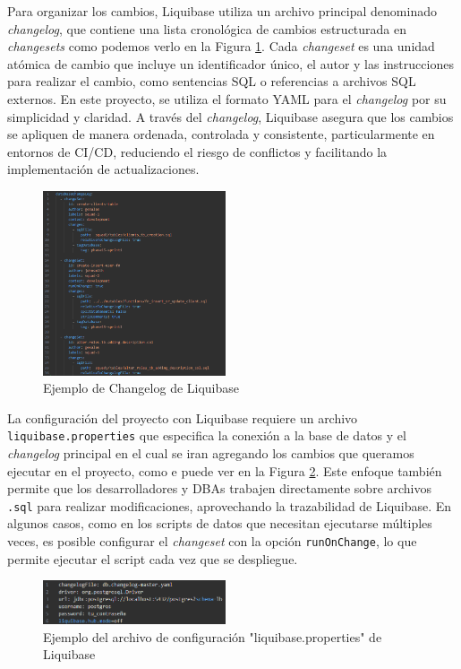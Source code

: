 \documentclass{IEEEtran}
\begin{document}
Para organizar los cambios, Liquibase utiliza un archivo principal denominado \textit{changelog}, que contiene una lista cronológica de cambios estructurada en \textit{changesets} como podemos verlo en la Figura \ref{fig:changelogFig}. Cada \textit{changeset} es una unidad atómica de cambio que incluye un identificador único, el autor y las instrucciones para realizar el cambio, como sentencias SQL o referencias a archivos SQL externos. En este proyecto, se utiliza el formato YAML para el \textit{changelog} por su simplicidad y claridad. A través del \textit{changelog}, Liquibase asegura que los cambios se apliquen de manera ordenada, controlada y consistente, particularmente en entornos de CI/CD, reduciendo el riesgo de conflictos y facilitando la implementación de actualizaciones.

\begin{figure}[H]
    \centering
    \includegraphics[width=0.48\textwidth]{images/changelogExample.png}
    \caption{Ejemplo de Changelog de Liquibase}
    \label{fig:changelogFig}
\end{figure}

La configuración del proyecto con Liquibase requiere un archivo \texttt{liquibase.properties} que especifica la conexión a la base de datos y el \textit{changelog} principal en el cual se iran agregando los cambios que queramos ejecutar en el proyecto, como e puede ver en la Figura \ref{fig:liquibasePropertiesExample}. Este enfoque también permite que los desarrolladores y DBAs trabajen directamente sobre archivos \texttt{.sql} para realizar modificaciones, aprovechando la trazabilidad de Liquibase. En algunos casos, como en los scripts de datos que necesitan ejecutarse múltiples veces, es posible configurar el \textit{changeset} con la opción \texttt{runOnChange}, lo que permite ejecutar el script cada vez que se despliegue.

\begin{figure}[H]
    \centering
    \includegraphics[width=0.48\textwidth]{images/liquibasePropertiesExample.png}
    \caption{Ejemplo del archivo de configuración "liquibase.properties" de Liquibase}
    \label{fig:liquibasePropertiesExample}
\end{figure}
\end{document}
